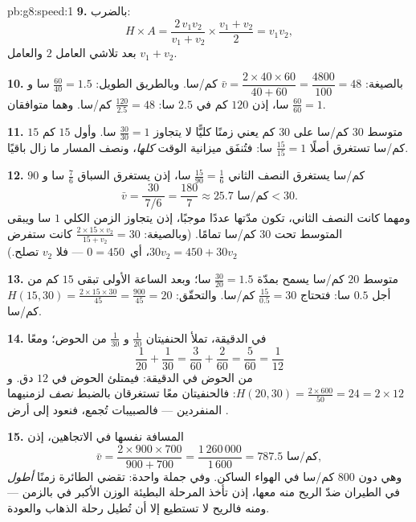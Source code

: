 \begin{solution}{pb:g8:speed:1}
\textbf{9.} بالضرب:
\[
H \times A
= \frac{2\, v_1 v_2}{v_1 + v_2} \times \frac{v_1 + v_2}{2}
= v_1 v_2 ,
\]
بعد تلاشي العامل $2$ والعامل $v_1 + v_2$.

\textbf{10.} بالصيغة: $\bar v = \dfrac{2 \times 40 \times 60}
{40 + 60} = \dfrac{4800}{100} = 48$ كم/سا. وبالطريق الطويل:
$\frac{60}{40} = 1.5$ سا و $\frac{60}{60} = 1$ سا، إذن $120$ كم في
$2.5$ سا: $\frac{120}{2.5} = 48$ كم/سا. وهما متوافقان.

\textbf{11.} متوسط $30$ كم/سا على $30$ كم يعني زمنًا كليًّا
لا يتجاوز $\frac{30}{30} = 1$ سا. وأول $15$ كم  $15$ كم/سا
تستغرق أصلًا $\frac{15}{15} = 1$ سا: فتُنفَق ميزانية الوقت
\emph{كلها}، ونصف المسار ما زال باقيًا.

\textbf{12.}  $90$ كم/سا يستغرق النصف الثاني
$\frac{15}{90} = \frac16$ سا، إذن يستغرق السباق $\frac76$ سا و
\[
\bar v = \frac{30}{\ 7/6\ } = \frac{180}{7} \approx 25.7
\text{ كم/سا} < 30 .
\]
ومهما كانت  النصف الثاني، تكون مدّتها عددًا
موجبًا، إذن يتجاوز الزمن الكلي $1$ سا ويبقى المتوسط
تحت $30$ كم/سا تمامًا. (وبالصيغة: $\frac{2 \times 15
\times v_2}{15 + v_2} = 30$ كانت ستفرض $30 v_2 = 450 + 30 v_2$،
أي\ $0 = 450$ --- فلا  $v_2$ تصلح.)

\textbf{13.} متوسط $20$ كم/سا يسمح بمدّة $\frac{30}{20} = 1.5$ سا؛
وبعد الساعة الأولى تبقى $15$ كم من أجل $0.5$ سا: فتحتاج
$\frac{15}{0.5} = 30$ كم/سا. والتحقّق:
$H(15, 30) = \frac{2 \times 15 \times 30}{45} = \frac{900}{45}
= 20$ كم/سا.

\textbf{14.} في الدقيقة، تملأ الحنفيتان $\frac{1}{20}$ و
$\frac{1}{30}$ من الحوض؛ ومعًا
\[
\frac{1}{20} + \frac{1}{30}
= \frac{3}{60} + \frac{2}{60}
= \frac{5}{60} = \frac{1}{12}
\]
من الحوض في الدقيقة: فيمتلئ الحوض في $12$ دق. و
$H(20, 30) = \frac{2 \times 600}{50} = 24 = 2 \times 12$: فالحنفيتان
معًا تستغرقان بالضبط \emph{نصف } لزمنيهما
المنفردين --- فالصبيبات تُجمع، فنعود إلى أرض .

\textbf{15.} المسافة نفسها في الاتجاهين، إذن
\[
\bar v = \frac{2 \times 900 \times 700}{900 + 700}
= \frac{1\,260\,000}{1\,600} = 787.5 \text{ كم/سا},
\]
وهي دون $800$ كم/سا في الهواء الساكن. وفي جملة واحدة: تقضي الطائرة
زمنًا \emph{أطول} في الطيران ضدّ الريح منه معها، إذن تأخذ المرحلة
البطيئة الوزن الأكبر في  بالزمن --- ومنه
فالريح لا تستطيع إلا أن تُطيل رحلة الذهاب والعودة.
\end{solution}
